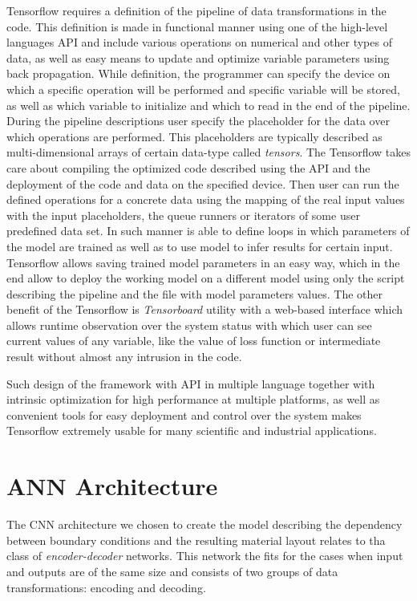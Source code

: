 Tensorflow requires a definition of the pipeline of data transformations in the code.
This definition is made in functional manner using one of the high-level languages API and include various operations on numerical and other types of data, as well as easy means to update and optimize variable parameters using back propagation. 
While definition, the programmer can specify the device on which a specific operation will be performed and specific variable will be stored, as well as which variable to initialize and which to read in the end of the pipeline. 
During the pipeline descriptions user specify the placeholder for the data over which operations are performed. 
This placeholders are typically described as multi-dimensional arrays of certain data-type called \textit{tensors}.
The Tensorflow takes care about compiling the optimized code described using the API and the deployment of the code and data on the specified device. 
Then user can run the defined operations for a concrete data using the mapping of the real input values with the input placeholders, the queue runners or iterators of some user predefined data set.
In such manner is able to define loops in which parameters of the model are trained as well as to use model to infer results for certain input.
Tensorflow allows saving trained model parameters in an easy way, which in the end allow to deploy the working model on a different model using only the script describing the pipeline and the file with model parameters values.
The other benefit of the Tensorflow is \textit{Tensorboard} utility with a web-based interface which allows runtime observation over the system status with which user can see current values of any variable, like the value of loss function or intermediate result without almost any intrusion in the code.
\medskip

Such design of the framework with API in multiple language together with intrinsic optimization for high performance at multiple platforms, as well as convenient tools for easy deployment and control over the system makes Tensorflow extremely usable for many scientific and industrial applications.


\section{ANN Architecture}

The CNN architecture we chosen to create the model describing the dependency between boundary conditions and the resulting material layout relates to tha class of \textit{encoder-decoder} networks.
This network the fits for the cases when input and outputs are of the same size and consists of two groups of data transformations: encoding and decoding.

